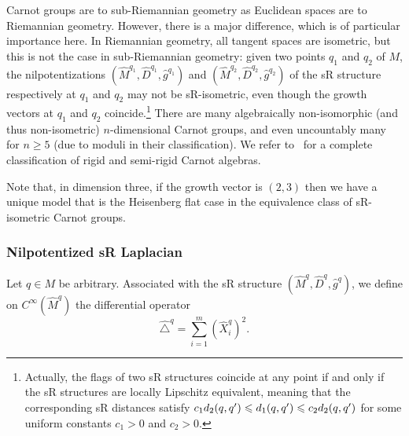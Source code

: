 \documentclass[AHL,Unicode,published]{cedram}
\renewcommand{\geq}{\geqslant}
\renewcommand{\leq}{\leqslant}
\begin{document}
\begin{rema}
Carnot groups are to sub-Riemannian geometry as Euclidean spaces are to Riemannian geometry. However, there is a major difference, which is of particular importance here. In Riemannian geometry, all tangent spaces are isometric, but this is not the case in sub-Riemannian geometry: given two points $q_1$ and $q_2$ of $M$, the nilpotentizations $(\widehat{M}^{q_1},\widehat{D}^{q_1},\widehat{g}^{q_1})$ and $(\widehat{M}^{q_2},\widehat{D}^{q_2},\widehat{g}^{q_2})$ of the sR structure respectively at $q_1$ and $q_2$ may not be sR-isometric, even though the growth vectors at $q_1$ and $q_2$ coincide.\footnote{Actually, the flags of two sR structures coincide at any point if and only if the sR structures are locally Lipschitz equivalent, meaning that the corresponding sR distances satisfy $c_1 d_2(q,q')\linebreak\leq d_1(q,q')\leq c_2 d_2(q,q')$ for some uniform constants $c_1>0$ and $c_2>0$.} There are many algebraically non-isomorphic (and thus non-isometric) $n$-dimensional Carnot groups, and even uncountably many for $n\geq 5$ (due to moduli in their classification). We refer to~\cite{AgrachevMarigo_2005,Marigo_2007} for a complete classification of rigid and semi-rigid Carnot algebras.

Note that, in dimension three, if the growth vector is $(2,3)$ then we have a unique model that is the Heisenberg flat case in the equivalence class of sR-isometric Carnot groups.
\end{rema}

\subsubsection{Nilpotentized sR Laplacian}
Let $q\in M$ be arbitrary. Associated with the sR structure $(\widehat{M}^{q},\widehat{D}^{q},\widehat{g}^{q})$, we define on $C^\infty(\widehat{M}^{q})$ the differential operator
\begin{equation}\label{def_triangle_nilp}
\widehat{\triangle}^{q} = \sum_{i=1}^m \left(\widehat{X}^{q}_i\right)^2.
\end{equation}
\end{document}
